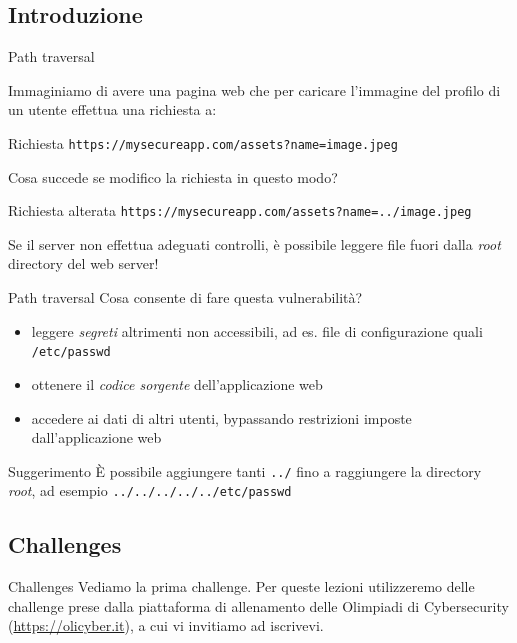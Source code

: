 \documentclass[12pt]{beamer}
\begin{document}
\subsection{Introduzione}
\begin{frame}{Path traversal}

Immaginiamo di avere una pagina web che per caricare l'immagine del profilo di un utente effettua una richiesta a:

\begin{block}{Richiesta}
\texttt{https://mysecureapp.com/assets?name=image.jpeg}
\end{block}

\pause
Cosa succede se modifico la richiesta in questo modo?

\begin{exampleblock}{Richiesta alterata}
\texttt{https://mysecureapp.com/assets?name=../image.jpeg}
\end{exampleblock}
    
\pause

Se il server non effettua adeguati controlli, è possibile leggere file fuori dalla \textit{root} directory del web server!

\end{frame}
\begin{frame}{Path traversal}
Cosa consente di fare questa vulnerabilità?

\pause
\begin{itemize}
    \item leggere \textit{segreti} altrimenti non accessibili, ad es. file di configurazione quali \texttt{/etc/passwd}
    \pause
    \item ottenere il \textit{codice sorgente} dell'applicazione web
    \pause
    \item accedere ai dati di altri utenti, bypassando restrizioni imposte dall'applicazione web
    \pause
\end{itemize}

\begin{alertblock}{Suggerimento}
È possibile aggiungere tanti \texttt{../} fino a raggiungere la directory \textit{root}, ad esempio \texttt{../../../../../etc/passwd}
\end{alertblock}

\end{frame}
\subsection{Challenges}
\begin{frame}{Challenges}
Vediamo la prima challenge. Per queste lezioni utilizzeremo delle challenge 
prese dalla piattaforma di allenamento delle Olimpiadi di Cybersecurity (\url{https://olicyber.it}), 
a cui vi invitiamo ad iscrivevi.
\end{frame}
\end{document}
